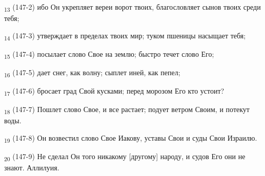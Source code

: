 \begin{tcolorbox}
\textsubscript{13} (147-2) ибо Он укрепляет вереи ворот твоих, благословляет сынов твоих среди тебя;
\end{tcolorbox}
\begin{tcolorbox}
\textsubscript{14} (147-3) утверждает в пределах твоих мир; туком пшеницы насыщает тебя;
\end{tcolorbox}
\begin{tcolorbox}
\textsubscript{15} (147-4) посылает слово Свое на землю; быстро течет слово Его;
\end{tcolorbox}
\begin{tcolorbox}
\textsubscript{16} (147-5) дает снег, как волну; сыплет иней, как пепел;
\end{tcolorbox}
\begin{tcolorbox}
\textsubscript{17} (147-6) бросает град Свой кусками; перед морозом Его кто устоит?
\end{tcolorbox}
\begin{tcolorbox}
\textsubscript{18} (147-7) Пошлет слово Свое, и все растает; подует ветром Своим, и потекут воды.
\end{tcolorbox}
\begin{tcolorbox}
\textsubscript{19} (147-8) Он возвестил слово Свое Иакову, уставы Свои и суды Свои Израилю.
\end{tcolorbox}
\begin{tcolorbox}
\textsubscript{20} (147-9) Не сделал Он того никакому [другому] народу, и судов Его они не знают. Аллилуия.
\end{tcolorbox}
